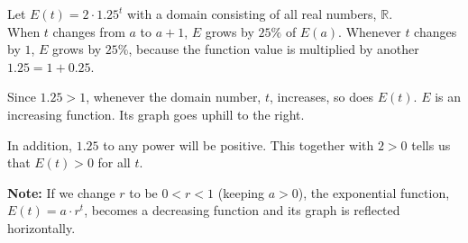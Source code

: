 \documentclass{ximera}
\begin{document}
\begin{example}

Let $E(t) = 2 \cdot 1.25^t$ with a domain consisting of all real numbers, $\mathbb{R}$. \\

When $t$ changes from $a$ to $a+1$, $E$ grows by $25\%$ of $E(a)$.  Whenever $t$ changes by $1$, $E$ grows by $25\%$, because the function value is multiplied by another $1.25 = 1 + 0.25$.


Since $1.25 > 1$, whenever the domain number, $t$, increases, so does $E(t)$.  $E$ is an increasing function.  Its graph goes uphill to the right.









\begin{image}
\end{image}





In addition, $1.25$ to any power will be positive.  This together with $2>0$ tells us that $E(t) > 0$ for all $t$.


\end{example}


\textbf{Note:} If we change $r$ to be $0 < r < 1$ (keeping $a>0$), the exponential function, $E(t) = a \cdot r^t$, becomes a decreasing function and its graph is reflected horizontally.
\end{document}
